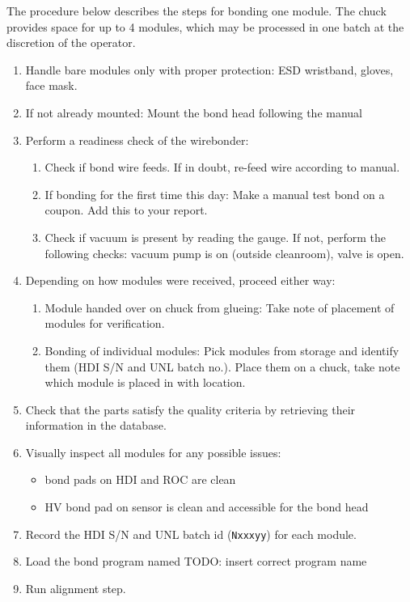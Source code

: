 \documentclass[12pt]{unlsilabsop}
\begin{document}
The procedure below describes the steps for bonding one module. The chuck provides space for up to 4 modules, which may be processed in one batch at the discretion of the operator.
\begin{enumerate}
    \item Handle bare modules only with proper protection: ESD wristband, gloves, face mask.
    \item If not already mounted: Mount the bond head following the manual
    \item Perform a readiness check of the wirebonder:
    \begin{enumerate}
	\item Check if bond wire feeds. If in doubt, re-feed wire according to manual.
	\item If bonding for the first time this day: Make a manual test bond on a coupon. Add this to your report.
	\item Check if vacuum is present by reading the gauge. If not, perform the following checks: vacuum pump is on (outside cleanroom), valve is open.
    \end{enumerate}
    \item Depending on how modules were received, proceed either way:
    \begin{enumerate}
	\item Module handed over on chuck from glueing: Take note of placement of modules for verification.
	\item Bonding of individual modules: Pick modules from storage and identify them (HDI S/N and UNL batch no.). Place them on a chuck, take note which module is placed in with location.
    \end{enumerate}
    \item Check that the parts satisfy the quality criteria by retrieving their information in the database. 
    \item Visually inspect all modules for any possible issues:
    \begin{itemize}
	\item bond pads on HDI and ROC are clean
	\item HV bond pad on sensor is clean and accessible for the bond head
    \end{itemize}
    \item Record the HDI S/N and UNL batch id (\texttt{Nxxxyy}) for each module.
    \item Load the bond program named TODO: insert correct program name
    \item Run alignment step.

\end{enumerate}
\end{document}

